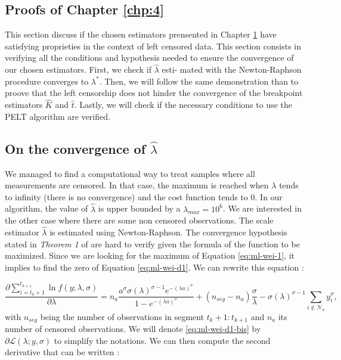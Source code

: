 \begin{appendices}
\chapter{Proofs of Chapter \ref{chp:4}} \label{app:chap4}

This section discuss if the chosen estimators prensented in Chapter \ref{app:chap4} have satisfying proprieties in the context of left censored data. This section consists in verifying all the conditions and hypothesis needed to ensure the convergence of our chosen estimators. First, we check if $\hat \lambda$ esti-
mated with the Newton-Raphson procedure converges to $\lambda^*$. Then, we will follow the same demonstration than \cite{Lavielle1997} to proove that the left censorship does not hinder the convergence of the breakpoint estimators $\hat K$ and $\hat t$. Lastly, we will check if the necessary conditions to use the PELT algorithm are verified. 

\section{On the convergence of \texorpdfstring{$\hat\lambda$}{l}}

We managed to find a computational way to treat samples where all measurements are censored. In that case, the maximum is reached when $\lambda$ tends to infinity (there is no convergence) and the cost function tends to 0. In our algorithm, the value of $\hat\lambda$ is upper bounded by a $\lambda_{max} = 10^6$.   
We are interested in the other case where there are some non censored observations. The scale estimator $\hat\lambda$ is estimated using Newton-Raphson. The convergence hypothesis stated in \textit{Theorem 1} of \cite{Verbeke1995} are hard to verify given the formula of the function to be maximized. Since we are looking for the maximum of Equation \ref{eq:ml-wei-1}, it implies to find the zero of Equation \ref{eq:ml-wei-d1}. We can rewrite this equation : 

\begin{equation}\label{eq:ml-wei-d1-bis}
\frac{\partial\sum_{i=t_{k}+1}^{t_{k+1}}\ln f(y;\lambda,\sigma)}{\partial \lambda} = n_a\frac{a^\sigma\sigma(\lambda)^{\sigma-1}e^{-(\lambda a)^\sigma}}{1-e^{-(\lambda a)^\sigma}} + (n_{seg}-n_a)\frac{\sigma}{\lambda} - \sigma(\lambda)^{\sigma-1}\sum_{i \notin \mathcal{N}_a}y_i^{\sigma}, 
\end{equation}
with $n_{seg}$ being the number of observations in segment $t_{k}+1:t_{k+1}$ and $n_a$ its number of censored observations. We will denote \ref{eq:ml-wei-d1-bis} by $\partial\mathcal{L}(\lambda;y,\sigma)$ to simplify the notations. We can then compute the second derivative that can be written : 


\end{appendices}
